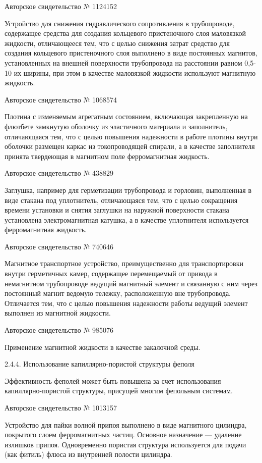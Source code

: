 Авторское свидетельство № 1124152

Устройство для снижения  гидравлического сопротивления в трубопроводе,
содержащее  средства   для  создания  кольцевого   пристеночного  слоя
маловязкой  жидкости, отличающееся  тем, что  с целью  снижения затрат
средство для  создания кольцевого пристеночного слоя  выполнено в виде
постоянных магнитов, установленных на внешней поверхности трубопровода
на расстоянии равном 0,5-10 их  ширины, при этом в качестве маловязкой
жидкости используют магнитную жидкость.


Авторское свидетельство № 1068574

Плотина с изменяемым агрегатным состоянием, включающая закрепленную на
флютбете замкнутую  оболочку из  эластичного материала  и заполнитель,
отличающаяся  тем,   что  с   целью  повышения  надежности   в  работе
плотины  внутри оболочки  размещен каркас  из токопроводящей  спирали,
а  в   качестве  заполнителя  принята  твердеющая   в  магнитном  поле
ферромагнитная жидкость.


Авторское свидетельство № 438829

Заглушка,   например  для   герметизации   трубопровода  и   горловин,
выполненная в  виде стакана под  уплотнитель, отличающаяся тем,  что с
целью  сокращения  времени установки  и  снятия  заглушки на  наружной
поверхности стакана установлена электромагнитная катушка, а в качестве
уплотнителя используется ферромагнитная жидкость.


Авторское свидетельство № 740646

Магнитное транспортное устройство, преимущественно для транспортировки
внутри  герметичных  камер,  содержащее   перемещаемый  от  привода  в
немагнитном  трубопроводе  ведущий  магнитный элемент  и  связанную  с
ним  через  постоянный  магнит   ведомую  тележку,  расположенную  вне
трубопровода. Отличается тем, что  с целью повышения надежности работы
ведущий элемент выполнен из магнитной жидкости.


Авторское свидетельство № 985076

Применение магнитной жидкости в качестве закалочной среды.


2.4.4. Использование капиллярно-пористой структуры феполя

Эффективность  феполей  может  быть  повышена  за  счет  использования
капиллярно-пористой структуры, присущей многим фепольным системам.


Авторское свидетельство № 1013157

Устройство  для  пайки  волной  припоя  выполнено  в  виде  магнитного
цилиндра, покрытого слоем ферромагнитных частиц. Основное назначение —
удаление излишков припоя. Одновременно пористая структура используется
для подачи (как фитиль) флюса из внутренней полости цилиндра.


